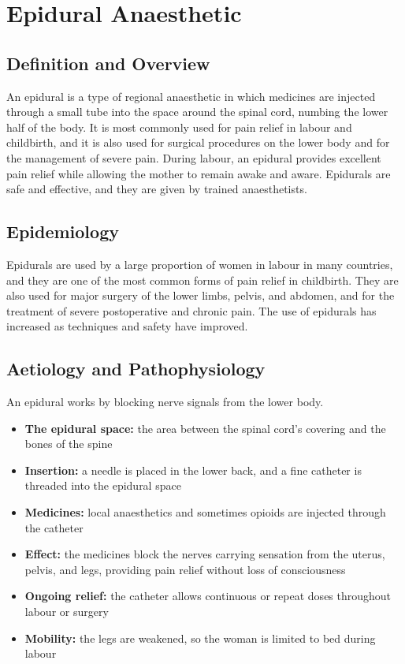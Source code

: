 \chapter{Epidural Anaesthetic}

\section*{Definition and Overview}
An epidural is a type of regional anaesthetic in which medicines are injected through a small tube into the space around the spinal cord, numbing the lower half of the body. It is most commonly used for pain relief in labour and childbirth, and it is also used for surgical procedures on the lower body and for the management of severe pain. During labour, an epidural provides excellent pain relief while allowing the mother to remain awake and aware. Epidurals are safe and effective, and they are given by trained anaesthetists.

\section*{Epidemiology}
Epidurals are used by a large proportion of women in labour in many countries, and they are one of the most common forms of pain relief in childbirth. They are also used for major surgery of the lower limbs, pelvis, and abdomen, and for the treatment of severe postoperative and chronic pain. The use of epidurals has increased as techniques and safety have improved.

\section*{Aetiology and Pathophysiology}
An epidural works by blocking nerve signals from the lower body.
\begin{itemize}
    \item \textbf{The epidural space:} the area between the spinal cord's covering and the bones of the spine
    \item \textbf{Insertion:} a needle is placed in the lower back, and a fine catheter is threaded into the epidural space
    \item \textbf{Medicines:} local anaesthetics and sometimes opioids are injected through the catheter
    \item \textbf{Effect:} the medicines block the nerves carrying sensation from the uterus, pelvis, and legs, providing pain relief without loss of consciousness
    \item \textbf{Ongoing relief:} the catheter allows continuous or repeat doses throughout labour or surgery
    \item \textbf{Mobility:} the legs are weakened, so the woman is limited to bed during labour
\end{itemize}

